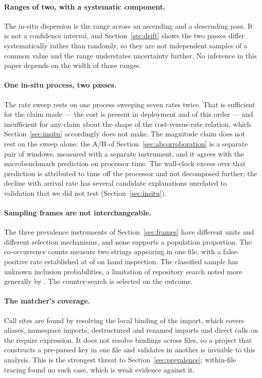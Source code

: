 \documentclass[pdflatex,sn-basic,twocolumn]{sn-jnl}%
\begin{document}
\paragraph{Ranges of two, with a systematic component.} The in-situ dispersion is
the range across an ascending and a descending pass. It is not a confidence
interval, and Section~\ref{sec:drift} shows the two passes differ systematically
rather than randomly, so they are not independent samples of a common value and
the range understates uncertainty further. No inference in this paper depends on
the width of those ranges.

\paragraph{One in-situ process, two passes.} The rate sweep rests on one
process sweeping seven rates twice. That is sufficient for the claim made ---
the cost is present in deployment and of this order --- and insufficient for any
claim about the shape of the cost-versus-rate relation, which
Section~\ref{sec:insitu} accordingly does not make. The magnitude claim does not
rest on the sweep alone: the A/B of Section~\ref{sec:abcorroboration} is a
separate pair of windows, measured with a separate instrument, and it agrees
with the microbenchmark prediction on processor time. The wall-clock excess over
that prediction is attributed to time off the processor and not decomposed
further; the decline with arrival rate has several candidate explanations
unrelated to validation that we did not test (Section~\ref{sec:insitu}).

\paragraph{Sampling frames are not interchangeable.} The three prevalence
instruments of Section~\ref{sec:frames} have different units and different
selection mechanisms, and none supports a population proportion. The
co-occurrence counts measure two strings appearing in one file, with a
false-positive rate established at \AdjudicatedFalsePositive{} of
\AdjudicatedTotal{} on hand inspection. The classified sample has unknown
inclusion probabilities, a limitation of repository search noted more generally
by \citet{kalliamvakou2014promises}. The counter-search is
selected on the outcome.

\paragraph{The matcher's coverage.} Call sites are found by resolving the local
binding of the import, which covers aliases, namespace imports, destructured and
renamed imports and direct calls on the require expression. It does not resolve
bindings across files, so a project that constructs a pre-parsed key in one file
and validates in another is invisible to this analysis. This is the strongest
threat to Section~\ref{sec:prevalence}; within-file tracing found no such case,
which is weak evidence against it.
\end{document}
